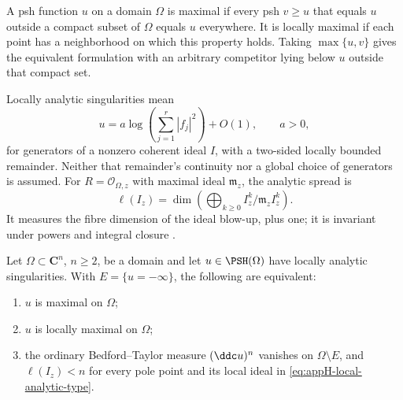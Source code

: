\begin{definition}
\label{def:appH-local-global-maximal}
A psh function \(u\) on a domain \(\Omega\) is maximal if every
psh \(v\geq u\) that equals \(u\) outside a compact subset of
\(\Omega\) equals \(u\) everywhere. It is locally maximal if
each point has a neighborhood on which this property holds.
Taking \(\max\{u,v\}\) gives the equivalent formulation with
an arbitrary competitor lying below \(u\) outside that compact set.
\end{definition}

Locally analytic singularities mean
\[
 u=a\log\!\left(\sum_{j=1}^r|f_j|^2\right)+O(1),
 \qquad a>0,
 \tag{H.2}\label{eq:appH-local-analytic-type}
\]
for generators of a nonzero coherent ideal \(I\), with a
two-sided locally bounded remainder. Neither that remainder's
continuity nor a global choice of generators is assumed. For
\(R=\mathcal O_{\Omega,z}\) with maximal ideal \(\mathfrak m_z\),
the analytic spread is
\[
 \ell(I_z)=\dim\!\left(
       \bigoplus_{k\geq0}I_z^k/\mathfrak m_z I_z^k\right).
 \tag{H.3}\label{eq:appH-analytic-spread}
\]
It measures the fibre dimension of the ideal blow-up, plus one;
it is invariant under powers and integral closure
\cite[\S\S2--4]{LejeuneTeissier08}.

\begin{theorem}
\label{thm:appH-analytic-local-global}
Let \(\Omega\subset\mathbf C^n\), \(n\geq2\), be a domain and
let \(u\in\PSH(\Omega)\) have locally analytic singularities.
With \(E=\{u=-\infty\}\), the following are equivalent:
\begin{enumerate}
\item \(u\) is maximal on \(\Omega\);
\item \(u\) is locally maximal on \(\Omega\);
\item the ordinary Bedford--Taylor measure
\((\ddc u)^n\) vanishes on \(\Omega\setminus E\), and
\(\ell(I_z)<n\) for every pole point and its local ideal in
\eqref{eq:appH-local-analytic-type}.
\end{enumerate}
\end{theorem}

